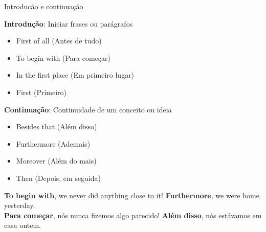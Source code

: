 \documentclass[compress,mathserif,xcolor=table]{beamer}
\begin{document}
\begin{frame}{Introducão e continuação}

\textbf{Introdução}: Iniciar frases ou parágrafos

\vspace{0.25cm}

\begin{minipage}{.49\textwidth}
\begin{itemize}
    \item First of all (Antes de tudo)
    \item To begin with (Para começar)
\end{itemize}
\end{minipage}
\begin{minipage}{.49\textwidth}
\begin{itemize}
    \item In the first place (Em primeiro lugar)
    \item First (Primeiro)
\end{itemize}
\end{minipage}

\vspace{0.25cm}

\textbf{Continuação}: Continuidade de um conceito ou ideia

\vspace{0.25cm}

\begin{minipage}{.49\textwidth}
\begin{itemize}
    \item Besides that (Além disso)
    \item Furthermore (Ademais)
\end{itemize}
\end{minipage}
\begin{minipage}{.49\textwidth}
\begin{itemize}
    \item Moreover (Além do mais)
    \item Then (Depois, em seguida)
\end{itemize}
\end{minipage}

\vspace{0.5cm}

\textbf{To begin with}, we never did anything close to it! \textbf{Furthermore}, we were home yesterday. \\
\vspace{0.15cm}
\textbf{Para começar}, nós nunca fizemos algo parecido! \textbf{Além disso}, nós estávamos em casa ontem.
\end{frame}
\end{document}
